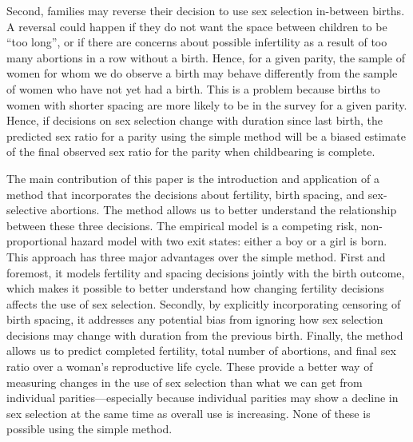 \documentclass[12pt,letterpaper]{article}
\begin{document}
Second,
families may reverse their decision to use sex selection in-between births.
A reversal could happen if they do not want the space between children to be 
``too long'', or if there are concerns about possible infertility as a result of 
too many abortions in a row without a birth.
Hence, for a given parity, the sample of women for whom we do observe a birth 
may behave differently from the sample of women who have not yet had a birth.
This is a problem because births to women with shorter spacing are more likely 
to be in the survey for a given parity.
Hence, if decisions on sex selection change with duration since last birth,
the predicted sex ratio for a parity using the simple method will be a 
biased estimate of the final observed sex ratio for the parity when 
childbearing is complete.



The main contribution of this paper is the introduction and application of a method that 
incorporates the decisions about fertility, birth spacing, and sex-selective abortions.
The method allows us to better understand the relationship between these three decisions.
The empirical model is a competing risk, non-proportional hazard model with two exit 
states: either a boy or a girl is born.
This approach has three major advantages over the simple method.
First and foremost, it models fertility and spacing decisions jointly with the birth 
outcome, which makes it possible to better understand how changing fertility decisions
affects the use of sex selection.
Secondly, by explicitly incorporating censoring of birth spacing, it addresses any 
potential bias from ignoring how sex selection decisions may change with duration from 
the previous birth.
Finally, the method allows us to predict completed fertility, total number of abortions, 
and final sex ratio over a woman's reproductive life cycle.
These provide a better way of measuring changes in the use of sex selection 
than what we can get from individual parities---especially because individual 
parities may show a decline in sex selection at the same time as overall
use is increasing.
None of these is possible using the simple method.
\end{document}
